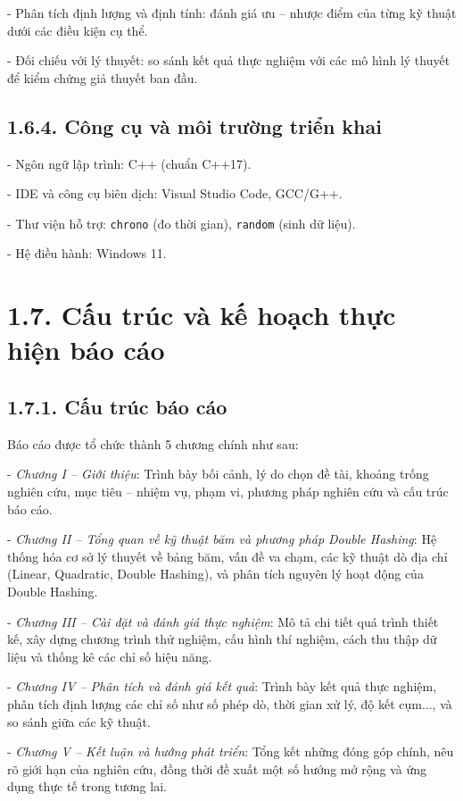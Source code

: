 \documentclass[12pt,a4paper]{report}
\begin{document}
    - Phân tích định lượng và định tính: đánh giá ưu – nhược điểm của từng kỹ thuật dưới các điều kiện cụ thể.
    
    - Đối chiếu với lý thuyết: so sánh kết quả thực nghiệm với các mô hình lý thuyết để kiểm chứng giả thuyết ban đầu.

\subsection*{1.6.4. Công cụ và môi trường triển khai}

    \noindent \indent - Ngôn ngữ lập trình: C++ (chuẩn C++17).
    
    - IDE và công cụ biên dịch: Visual Studio Code, GCC/G++.
    
    - Thư viện hỗ trợ: \texttt{chrono} (đo thời gian), \texttt{random} (sinh dữ liệu).
    
   - Hệ điều hành: Windows 11.

\section*{1.7. Cấu trúc và kế hoạch thực hiện báo cáo}
\subsection*{1.7.1. Cấu trúc báo cáo}
\noindent \indent Báo cáo được tổ chức thành 5 chương chính như sau:

- \textit{Chương I – Giới thiệu}: Trình bày bối cảnh, lý do chọn đề tài, khoảng trống nghiên cứu, mục tiêu – nhiệm vụ, phạm vi, phương pháp nghiên cứu và cấu trúc báo cáo.

-\textit{ Chương II – Tổng quan về kỹ thuật băm và phương pháp Double Hashing}: Hệ thống hóa cơ sở lý thuyết về bảng băm, vấn đề va chạm, các kỹ thuật dò địa chỉ (Linear, Quadratic, Double Hashing), và phân tích nguyên lý hoạt động của Double Hashing.

- \textit{Chương III – Cài đặt và đánh giá thực nghiệm}: Mô tả chi tiết quá trình thiết kế, xây dựng chương trình thử nghiệm, cấu hình thí nghiệm, cách thu thập dữ liệu và thống kê các chỉ số hiệu năng.

- \textit{Chương IV – Phân tích và đánh giá kết quả}: Trình bày kết quả thực nghiệm, phân tích định lượng các chỉ số như số phép dò, thời gian xử lý, độ kết cụm..., và so sánh giữa các kỹ thuật.

- \textit{Chương V – Kết luận và hướng phát triển}: Tổng kết những đóng góp chính, nêu rõ giới hạn của nghiên cứu, đồng thời đề xuất một số hướng mở rộng và ứng dụng thực tế trong tương lai.
\end{document}
